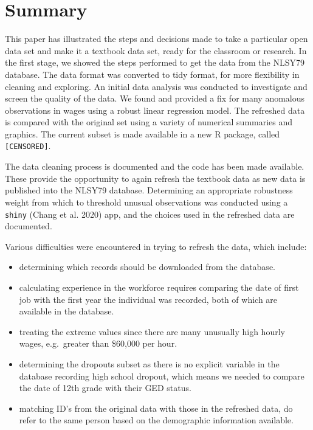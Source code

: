 \documentclass{article}
\providecommand{\tightlist}{%
  \setlength{\itemsep}{0pt}\setlength{\parskip}{0pt}}
\begin{document}
\hypertarget{summary}{%
\section{Summary}\label{summary}}

This paper has illustrated the steps and decisions made to take a particular open data set and make it a textbook data set, ready for the classroom or research. In the first stage, we showed the steps performed to get the data from the NLSY79 database. The data format was converted to tidy format, for more flexibility in cleaning and exploring. An initial data analysis was conducted to investigate and screen the quality of the data. We found and provided a fix for many anomalous observations in wages using a robust linear regression model. The refreshed data is compared with the original set using a variety of numerical summaries and graphics. The current subset is made available in a new R package, called \texttt{[CENSORED]}.

The data cleaning process is documented and the code has been made available. These provide the opportunity to again refresh the textbook data as new data is published into the NLSY79 database.
Determining an appropriate robustness weight from which to threshold unusual observations was conducted using a \texttt{shiny} (Chang et al. 2020) app, and the choices used in the refreshed data are documented.

Various difficulties were encountered in trying to refresh the data, which include:

\begin{itemize}
\tightlist
\item
  determining which records should be downloaded from the database.
\item
  calculating experience in the workforce requires comparing the date of first job with the first year the individual was recorded, both of which are available in the database.
\item
  treating the extreme values since there are many unusually high hourly wages, e.g.~greater than \$60,000 per hour.
\item
  determining the dropouts subset as there is no explicit variable in the database recording high school dropout, which means we needed to compare the date of 12th grade with their GED status.
\item
  matching ID's from the original data with those in the refreshed data, do refer to the same person based on the demographic information available.
\end{itemize}
\end{document}
